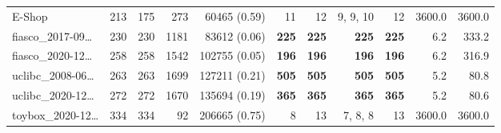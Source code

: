 \begin{table*}
\begin{tiny}
{\begin{tabular}{lrrrrrrrrrr}
E-Shop & \num[text-series-to-math=true]{213} & \num[text-series-to-math=true]{175} & \num[text-series-to-math=true]{273} & \num[text-series-to-math=true]{60465} (\num[text-series-to-math=true]{0.59}) & \num[text-series-to-math=true]{11} & \num[text-series-to-math=true]{12} & \num[text-series-to-math=true]{9}, \num[text-series-to-math=true]{9}, \num[text-series-to-math=true]{10} & \num[text-series-to-math=true]{12} & 3600.0 & 3600.0\\
fiasco\_2017-09\ldots & \num[text-series-to-math=true]{230} & \num[text-series-to-math=true]{230} & \num[text-series-to-math=true]{1181} & \num[text-series-to-math=true]{83612} (\num[text-series-to-math=true]{0.06}) & \textbf{\num[text-series-to-math=true]{225}} & \textbf{\num[text-series-to-math=true]{225}} & \textbf{\num[text-series-to-math=true]{225}} & \textbf{\num[text-series-to-math=true]{225}} & 6.2 & 333.2\\
fiasco\_2020-12\ldots & \num[text-series-to-math=true]{258} & \num[text-series-to-math=true]{258} & \num[text-series-to-math=true]{1542} & \num[text-series-to-math=true]{102755} (\num[text-series-to-math=true]{0.05}) & \textbf{\num[text-series-to-math=true]{196}} & \textbf{\num[text-series-to-math=true]{196}} & \textbf{\num[text-series-to-math=true]{196}} & \textbf{\num[text-series-to-math=true]{196}} & 6.2 & 316.9\\
uclibc\_2008-06\ldots & \num[text-series-to-math=true]{263} & \num[text-series-to-math=true]{263} & \num[text-series-to-math=true]{1699} & \num[text-series-to-math=true]{127211} (\num[text-series-to-math=true]{0.21}) & \textbf{\num[text-series-to-math=true]{505}} & \textbf{\num[text-series-to-math=true]{505}} & \textbf{\num[text-series-to-math=true]{505}} & \textbf{\num[text-series-to-math=true]{505}} & 5.2 & 80.8\\
uclibc\_2020-12\ldots & \num[text-series-to-math=true]{272} & \num[text-series-to-math=true]{272} & \num[text-series-to-math=true]{1670} & \num[text-series-to-math=true]{135694} (\num[text-series-to-math=true]{0.19}) & \textbf{\num[text-series-to-math=true]{365}} & \textbf{\num[text-series-to-math=true]{365}} & \textbf{\num[text-series-to-math=true]{365}} & \textbf{\num[text-series-to-math=true]{365}} & 5.2 & 80.6\\
toybox\_2020-12\ldots & \num[text-series-to-math=true]{334} & \num[text-series-to-math=true]{334} & \num[text-series-to-math=true]{92} & \num[text-series-to-math=true]{206665} (\num[text-series-to-math=true]{0.75}) & \num[text-series-to-math=true]{8} & \num[text-series-to-math=true]{13} & \num[text-series-to-math=true]{7}, \num[text-series-to-math=true]{8}, \num[text-series-to-math=true]{8} & \num[text-series-to-math=true]{13} & 3600.0 & 3600.0\\

\end{tabular}}
\end{tiny}
\end{table*}
